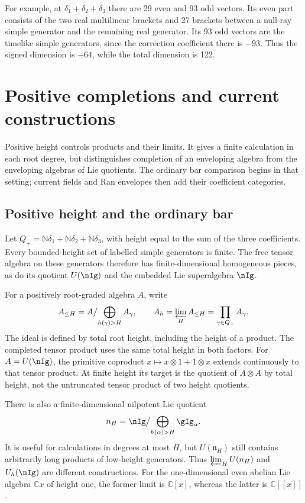 For example, at \(\delta_1+\delta_2+\delta_3\) there are
29 even and 93 odd vectors. Its even part consists of the two
real multilinear brackets and 27 brackets between a null-ray
simple generator and the remaining real generator. Its 93 odd
vectors are the timelike simple generators, since the correction
coefficient there is \(-93\). Thus the signed dimension is
\(-64\), while the total dimension is 122.

\chapter{Positive completions and current constructions}
\label{comp:ch:root-completions}

Positive height controls products and their limits. It gives a
finite calculation in each root degree, but distinguishes completion
of an enveloping algebra from the enveloping algebras of Lie
quotients. The ordinary bar comparison begins in that setting;
current fields and Ran envelopes then add their coefficient categories.

\section{Positive height and the ordinary bar}
\label{comp:sec:positive-bar}
Let \(Q_+=\mathbb N\delta_1+\mathbb N\delta_2+
\mathbb N\delta_3\), with height equal to the sum of the three
coefficients. Every bounded-height set of labelled simple generators
is finite. The free tensor algebra on these generators therefore has
finite-dimensional homogeneous pieces, as do its quotient
\(U(\nIg)\) and the embedded Lie superalgebra \(\nIg\).

For a positively root-graded algebra \(A\), write
\[
 A_{\leq H}=A\big/\!\bigoplus_{h(\gamma)>H}A_\gamma,
 \qquad
 \widehat A_h=\varprojlim_H A_{\leq H}
             =\prod_{\gamma\in Q_+}A_\gamma.
\]
The ideal is defined by total root height, including the height of a
product. The completed tensor product uses the same total height in
both factors. For \(A=U(\nIg)\), the primitive coproduct
\(x\mapsto x\otimes1+1\otimes x\) extends continuously to that
tensor product. At finite height its target is the quotient of
$A\otimes A$ by total height, not the untruncated tensor product
of two height quotients.

There is also a finite-dimensional nilpotent Lie quotient
\[
 \mathfrak n_H=\nIg\big/\!\bigoplus_{h(\alpha)>H}\gIg_\alpha.
\]
It is useful for calculations in degrees at most \(H\), but
\(U(\mathfrak n_H)\) still contains arbitrarily long products
of low-height generators. Thus \(\varprojlim_HU(\mathfrak n_H)\)
and \(\widehat U_h(\nIg)\) are different constructions.
For the one-dimensional even abelian Lie algebra \(\mathbb Cx\)
of height one, the former limit is \(\mathbb C[x]\), whereas
the latter is \(\mathbb C[[x]]\).


